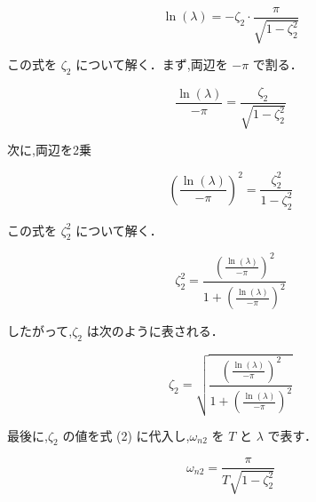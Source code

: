 \[
  \ln(\lambda) = -\zeta_2 \cdot \frac{\pi}{\sqrt{1 - \zeta_2^2}} \tag{5}
\]

この式を \(\zeta_2\) について解く．まず,両辺を \(-\pi\) で割る．

\[
  \frac{\ln(\lambda)}{-\pi} = \frac{\zeta_2}{\sqrt{1 - \zeta_2^2}} \tag{6}
\]

次に,両辺を2乗

\[
  \left( \frac{\ln(\lambda)}{-\pi} \right)^2 = \frac{\zeta_2^2}{1 - \zeta_2^2} \tag{7}
\]

この式を \(\zeta_2^2\) について解く．

\[
  \zeta_2^2 = \frac{\left( \frac{\ln(\lambda)}{-\pi} \right)^2}{1 + \left( \frac{\ln(\lambda)}{-\pi} \right)^2} \tag{8}
\]

したがって,\(\zeta_2\) は次のように表される．

\[
  \zeta_2 = \sqrt{\frac{\left( \frac{\ln(\lambda)}{-\pi} \right)^2}{1 + \left( \frac{\ln(\lambda)}{-\pi} \right)^2}} \tag{9}
\]

最後に,\(\zeta_2\) の値を式 (2) に代入し,\(\omega_{n2}\) を \(T\) と \(\lambda\) で表す．

\[
  \omega_{n2} = \frac{\pi}{T \sqrt{1 - \zeta_2^2}} \tag{10}
\]

